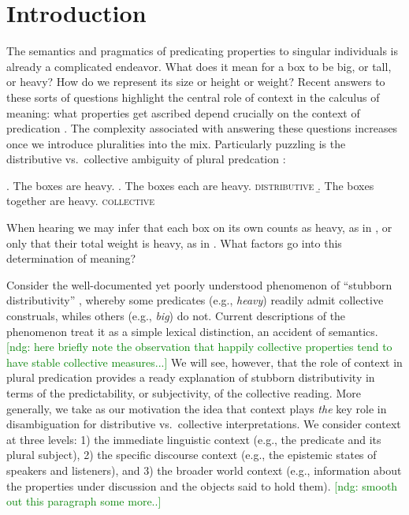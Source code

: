 \documentclass[linguex]{sp}
\newcommand{\ndg}[1]{\textcolor{Green}{[ndg: #1]}}
\begin{document}



\section{Introduction}

The semantics and pragmatics of predicating properties to singular individuals is already a complicated endeavor. What does it mean for a box to be big, or tall, or heavy? How do we represent its size or height or weight? Recent answers to these sorts of questions highlight the central role of context in the calculus of meaning: what properties get ascribed depend crucially on the context of predication \citep[cf.~tall for a boy vs.~tall for a basketball player;  e.g.,][]{kennedy1999,lassitergoodman2013}. The complexity associated with answering these questions increases once we introduce pluralities into the mix. 
Particularly puzzling is the distributive vs.~collective ambiguity of plural predcation \citep[e.g.,][]{link1983,link1987,link1998,scha1984,landman1989,landman1989b,landman1996,lasersohn1988,lasersohn1990,lasersohn1995,lasersohn1998,schwarzschild1994,schwarzschild1996}:

\ex. The boxes are heavy.
\a. The boxes each are heavy. \hfill \textsc{distributive}
\b. The boxes together are heavy. \hfill \textsc{collective}

When hearing \Last we may infer that each box on its own counts as heavy, as in \Last[a], or only that their total weight is heavy, as in \Last[b].
What factors go into this determination of meaning?

Consider the well-documented yet poorly understood phenomenon of ``stubborn distributivity'' \citep{quine1960,schwarzschild2011,vazquezrojas2012,zhang2013,syrett2015}, whereby some predicates (e.g., \emph{heavy}) readily admit collective construals, whiles others (e.g., \emph{big}) do not. Current descriptions of the phenomenon treat it as a simple lexical distinction, an accident of semantics. 
\ndg{here briefly note the observation that happily collective properties tend to have stable collective measures...}
We will see, however, that the role of context in plural predication provides a ready explanation of stubborn distributivity in terms of the predictability, or subjectivity, of the collective reading. 
More generally, we take as our motivation the idea that context plays \emph{the} key role in disambiguation for distributive vs.~collective interpretations. We consider context at three levels: 1) the immediate linguistic context (e.g., the predicate and its plural subject), 2) the specific discourse context (e.g., the epistemic states of speakers and listeners), and 3) the broader world context (e.g., information about the properties under discussion and the objects said to hold them). \ndg{smooth out this paragraph some more..}
\end{document}
